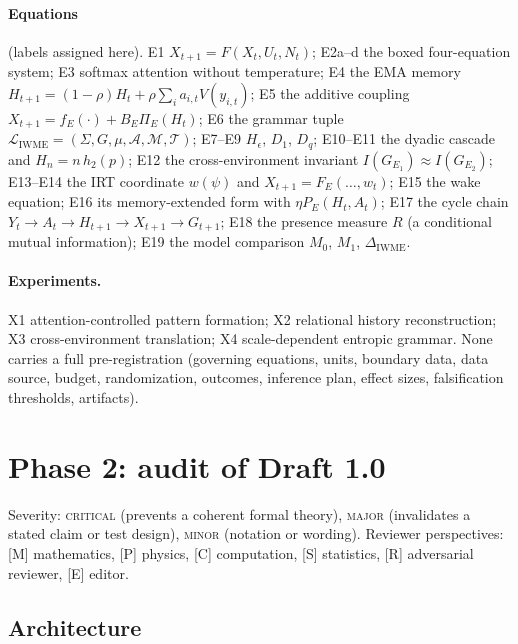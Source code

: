 \documentclass[11pt]{article}
\theoremstyle{definition}
\theoremstyle{remark}
\begin{document}
\paragraph{Equations} (labels assigned here). E1 $X_{t+1}=F(X_t,U_t,N_t)$; E2a--d the boxed four-equation system; E3 softmax attention without temperature; E4 the EMA memory $H_{t+1}=(1-\rho)H_t+\rho\sum_i a_{i,t}V(y_{i,t})$; E5 the additive coupling $X_{t+1}=f_E(\cdot)+B_E\Pi_E(H_t)$; E6 the grammar tuple $\mathcal L_{\mathrm{IWME}}=(\Sigma,G,\mu,\mathcal A,\mathcal M,\mathcal T)$; E7--E9 $H_\epsilon$, $D_1$, $D_q$; E10--E11 the dyadic cascade and $H_n=n\,h_2(p)$; E12 the cross-environment invariant $I(G_{E_1})\approx I(G_{E_2})$; E13--E14 the IRT coordinate $w(\psi)$ and $X_{t+1}=F_E(\dots,w_t)$; E15 the wake equation; E16 its memory-extended form with $\eta P_E(H_t,A_t)$; E17 the cycle chain $Y_t\to A_t\to H_{t+1}\to X_{t+1}\to G_{t+1}$; E18 the presence measure $R$ (a conditional mutual information); E19 the model comparison $M_0$, $M_1$, $\Delta_{\mathrm{IWME}}$.

\paragraph{Experiments.} X1 attention-controlled pattern formation; X2 relational history reconstruction; X3 cross-environment translation; X4 scale-dependent entropic grammar. None carries a full pre-registration (governing equations, units, boundary data, data source, budget, randomization, outcomes, inference plan, effect sizes, falsification thresholds, artifacts).

\section{Phase 2: audit of Draft 1.0}\label{sec:audit}

Severity: \textsc{critical} (prevents a coherent formal theory), \textsc{major} (invalidates a stated claim or test design), \textsc{minor} (notation or wording). Reviewer perspectives: [M] mathematics, [P] physics, [C] computation, [S] statistics, [R] adversarial reviewer, [E] editor.

\subsection{Architecture}
\end{document}

